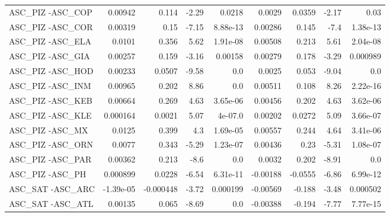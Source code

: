 \begin{tabular}{lrrrrrrrr}
ASC\_PIZ -ASC\_COP                        &     0.00942 &        0.114 &   -2.29 &   0.0218 &     0.0029 &      0.0359 &        -2.17 &          0.03 \\
ASC\_PIZ -ASC\_COR                        &     0.00319 &         0.15 &   -7.15 & 8.88e-13 &    0.00286 &       0.145 &         -7.4 &      1.38e-13 \\
ASC\_PIZ -ASC\_ELA                        &      0.0101 &        0.356 &    5.62 & 1.91e-08 &    0.00508 &       0.213 &         5.61 &      2.04e-08 \\
ASC\_PIZ -ASC\_GIA                        &     0.00257 &        0.159 &   -3.16 &  0.00158 &    0.00279 &       0.178 &        -3.29 &      0.000989 \\
ASC\_PIZ -ASC\_HOD                        &     0.00233 &       0.0507 &   -9.58 &      0.0 &     0.0025 &       0.053 &        -9.04 &           0.0 \\
ASC\_PIZ -ASC\_INM                        &     0.00965 &        0.202 &    8.86 &      0.0 &    0.00511 &       0.108 &         8.26 &      2.22e-16 \\
ASC\_PIZ -ASC\_KEB                        &     0.00664 &        0.269 &    4.63 & 3.65e-06 &    0.00456 &       0.202 &         4.63 &      3.62e-06 \\
ASC\_PIZ -ASC\_KLE                        &    0.000164 &       0.0021 &    5.07 &  4e-07.0 &    0.00202 &      0.0272 &         5.09 &      3.66e-07 \\
ASC\_PIZ -ASC\_MX                         &      0.0125 &        0.399 &     4.3 & 1.69e-05 &    0.00557 &       0.244 &         4.64 &      3.41e-06 \\
ASC\_PIZ -ASC\_ORN                        &      0.0077 &        0.343 &   -5.29 & 1.23e-07 &    0.00436 &        0.23 &        -5.31 &      1.08e-07 \\
ASC\_PIZ -ASC\_PAR                        &     0.00362 &        0.213 &    -8.6 &      0.0 &     0.0032 &       0.202 &        -8.91 &           0.0 \\
ASC\_PIZ -ASC\_PH                         &    0.000899 &       0.0228 &   -6.54 & 6.31e-11 &   -0.00188 &     -0.0555 &        -6.86 &      6.99e-12 \\
ASC\_SAT -ASC\_ARC                        &   -1.39e-05 &    -0.000448 &   -3.72 & 0.000199 &   -0.00569 &      -0.188 &        -3.48 &      0.000502 \\
ASC\_SAT -ASC\_ATL                        &     0.00135 &        0.065 &   -8.69 &      0.0 &   -0.00388 &      -0.194 &        -7.77 &      7.77e-15 \\

\end{tabular}
